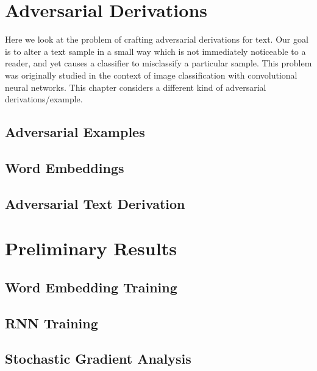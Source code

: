 \chapter{Adversarial Derivations}
Here we look at the problem of crafting adversarial derivations for text.  Our goal is to alter a text sample in a small way which is not immediately noticeable to a reader, and yet causes a classifier to misclassify a particular sample.  This problem was originally studied in the context of image classification with convolutional neural networks.  This chapter considers a different kind of adversarial derivations/example.

\section{Adversarial Examples} 

\section{Word Embeddings}\label{sec:word_embeddings}

\section{Adversarial Text Derivation}


\chapter{Preliminary Results}
\section{Word Embedding Training}

\section{RNN Training}

\section{Stochastic Gradient Analysis}\label{sec:stochastic_gradient_analysis}

